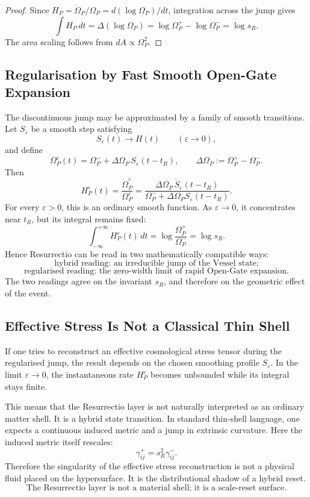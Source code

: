 \documentclass[11pt,a4paper,oneside]{book}
\theoremstyle{plain}
\theoremstyle{definition}
\theoremstyle{remark}
\begin{document}
\begin{proof}
Since \(H_P=\dot{\Omega}_P/\Omega_P=d(\log\Omega_P)/dt\), integration across
the jump gives
\[
\int H_P\,dt
=
\Delta(\log\Omega_P)
=
\log\Omega_P^+-\log\Omega_P^-
=
\log s_R.
\]
The area scaling follows from \(dA\propto\Omega_P^2\).
\end{proof}

\subsection{Regularisation by Fast Smooth Open-Gate Expansion}

The discontinuous jump may be approximated by a family of smooth transitions.
Let \(S_\varepsilon\) be a smooth step satisfying
\[
S_\varepsilon(t)\to H(t)
\qquad
(\varepsilon\to0),
\]
and define
\[
\Omega_P^\varepsilon(t)
=
\Omega_P^-
+
\Delta\Omega_P\,S_\varepsilon(t-t_R),
\qquad
\Delta\Omega_P:=\Omega_P^+-\Omega_P^-.
\]
Then
\[
H_P^\varepsilon(t)
=
\frac{\dot{\Omega}_P^\varepsilon}{\Omega_P^\varepsilon}
=
\frac{\Delta\Omega_P\,\dot S_\varepsilon(t-t_R)}
{\Omega_P^-+\Delta\Omega_P S_\varepsilon(t-t_R)}.
\]
For every \(\varepsilon>0\), this is an ordinary smooth function. As
\(\varepsilon\to0\), it concentrates near \(t_R\), but its integral remains
fixed:
\[
\int_{-\infty}^{+\infty}H_P^\varepsilon(t)\,dt
=
\log\frac{\Omega_P^+}{\Omega_P^-}
=
\log s_R.
\]
Hence Resurrectio can be read in two mathematically compatible ways:
\[
\boxed{
\text{hybrid reading: an irreducible jump of the Vessel state;}
}
\]
\[
\boxed{
\text{regularised reading: the zero-width limit of rapid Open-Gate expansion.}
}
\]
The two readings agree on the invariant \(s_R\), and therefore on the
geometric effect of the event.

\subsection{Effective Stress Is Not a Classical Thin Shell}

If one tries to reconstruct an effective cosmological stress tensor during the
regularised jump, the result depends on the chosen smoothing profile
\(S_\varepsilon\). In the limit \(\varepsilon\to0\), the instantaneous rate
\(H_P^\varepsilon\) becomes unbounded while its integral stays finite.

This means that the Resurrectio layer is not naturally interpreted as an
ordinary matter shell. It is a hybrid state transition. In standard thin-shell
language, one expects a continuous induced metric and a jump in extrinsic
curvature. Here the induced metric itself rescales:
\[
\gamma^+_{ij}=s_R^2\gamma^-_{ij}.
\]
Therefore the singularity of the effective stress reconstruction is not a
physical fluid placed on the hypersurface. It is the distributional shadow of
a hybrid reset.
\[
\boxed{
\text{The Resurrectio layer is not a material shell; it is a scale-reset surface.}
}
\]
\end{document}
